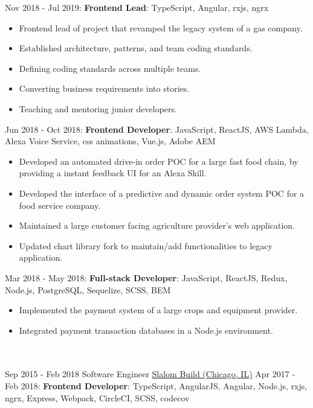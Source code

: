 \documentclass[letterpaper]{template} %
\begin{document}
\begin{twenty}
        {}
        {}
        {Nov 2018 - Jul 2019: \textbf{Frontend Lead}: TypeScript, Angular, rxjs, ngrx}
        {\begin{itemize}
            \item Frontend lead of project that revamped the legacy system of a gas company.
            \item Established architecture, patterns, and team coding standards.
            \item Defining coding standards across multiple teams.
            \item Converting business requirements into stories.
            \item Teaching and mentoring junior developers.
        \end{itemize}}
    \twentyitem
    	{}
		{}
        {}
        {}
        {Jun 2018 - Oct 2018: \textbf{Frontend Developer}: JavaScript, ReactJS, AWS Lambda, Alexa Voice Service, css animations, Vue.js, Adobe AEM}
        {\begin{itemize}
            \item Developed an automated drive-in order POC for a large fast food chain, by providing a instant feedback UI for an Alexa Skill.
            \item Developed the interface of a predictive and dynamic order system POC for a food service company.
            \item Maintained a large customer facing agriculture provider's web application.
            \item Updated chart library fork to maintain/add functionalities to legacy application.
        \end{itemize}}
    \twentyitem
    	{}
		{}
        {}
        {}
        {Mar 2018 - May 2018: \textbf{Full-stack Developer}: JavaScript, ReactJS, Redux, Node.js, PostgreSQL, Sequelize, SCSS, BEM}
        {\begin{itemize}
            \item Implemented the payment system of a large crops and equipment provider. 
            \item Integrated payment transaction databases in a Node.js environment.
        \end{itemize}}
    \\\divider\\
    \twentyitem
        {Sep 2015 - Feb 2018}
        {}
        {Software Engineer}
        {\href{https://www.slalom.com/}{Slalom Build (Chicago, IL)}}
        {Apr 2017 - Feb 2018: \textbf{Frontend Developer}: TypeScript, AngularJS, Angular, Node.js, rxjs, ngrx, Express, Webpack, CircleCI, SCSS, codecov}

\end{twenty}
\end{document}

